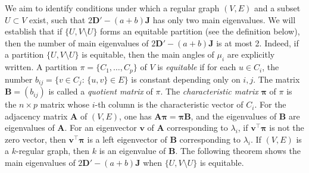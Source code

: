 \documentclass[a4paper, 11pt]{article}
\newcommand{\A}{\boldsymbol{A}}
\newcommand{\B}{\boldsymbol{B}}
\newcommand{\J}{\boldsymbol{J}}
\newcommand{\D}{\boldsymbol{D}}
\newcommand{\vv}{\boldsymbol{v}}
\theoremstyle{definition}
\begin{document}
We aim to identify conditions under which a regular graph $(V,E)$ and a subset $U \subset V$ exist, such that $2\D'-(a+b)\J$ has only two 
main eigenvalues. We will establish that if $\{U,V \setminus U \}$ forms an equitable partition (see the definition below), then the number of main eigenvalues of $2\D'-(a+b)\J$ is
 at most 2. 
Indeed, if a partition $\{U , V\setminus U\}$ is equitable, then the main angles of $\mu_i$ are explicitly written. 
A partition $\pi=\{C_1,\ldots,C_p \}$ of $V$ is {\it equitable} 
if for each $u \in C_i$, the number $b_{ij}=\{v \in C_j \colon\, \{u,v\} \in E\}$ is constant depending only on $i,j$. 
The matrix $\B=(b_{ij})$ is called a {\it quotient matrix} of $\pi$. 
The {\it characteristic matrix} $\boldsymbol{\pi}$ of $\pi$ is the $n\times p$ matrix whose $i$-th column is the characteristic vector of $C_i$. For the adjacency matrix $\A$ of $(V,E)$, 
one has $\A\boldsymbol{\pi}= \boldsymbol{\pi} \B$, and the eigenvalues of $\B$ are eigenvalues of $\A$. 
For an eigenvector $\vv$ of $\A$ corresponding to $\lambda_i$, if $\vv^\top  \boldsymbol{\pi}$ is not the zero vector, then $\vv^\top  \boldsymbol{\pi}$ is a left eigenvector of $\B$ corresponding to $\lambda_i$. 
If $(V,E)$ is a $k$-regular graph, then $k$ is an eigenvalue of $\B$. 
The following theorem shows the main eigenvalues of $2\D'-(a+b)\J$ when $\{U,V\setminus U\}$ is equitable. 
\end{document}
